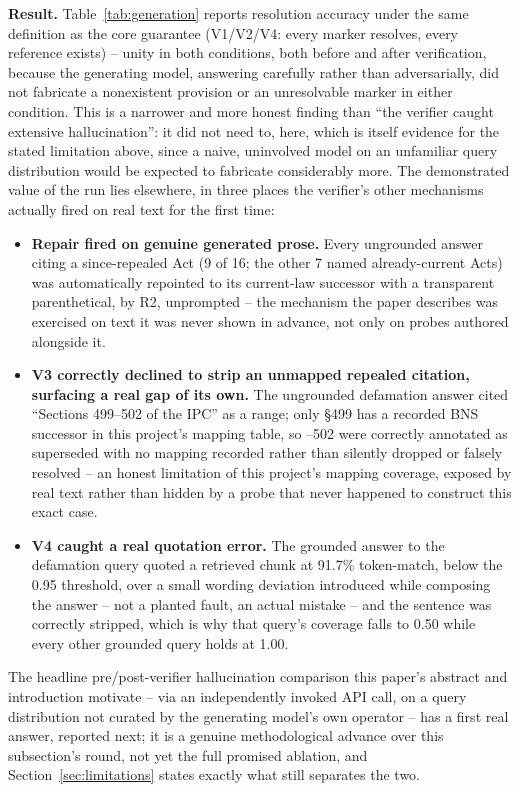 \documentclass[conference]{IEEEtran}
\begin{document}
\textbf{Result.} Table~\ref{tab:generation} reports resolution accuracy under
the same definition as the core guarantee (V1/V2/V4: every marker resolves,
every reference exists) -- unity in both conditions, both before and after
verification, because the generating model, answering carefully rather than
adversarially, did not fabricate a nonexistent provision or an unresolvable
marker in either condition. This is a narrower and more honest finding than
``the verifier caught extensive hallucination'': it did not need to, here,
which is itself evidence for the stated limitation above, since a naive,
uninvolved model on an unfamiliar query distribution would be expected to
fabricate considerably more. The demonstrated value of the run lies elsewhere,
in three places the verifier's other mechanisms actually fired on real text
for the first time:

\begin{itemize}
\item \textbf{Repair fired on genuine generated prose.} Every ungrounded
answer citing a since-repealed Act (9 of 16; the other 7 named already-current
Acts) was automatically repointed to its current-law successor with a
transparent parenthetical, by R2, unprompted -- the mechanism the paper
describes was exercised on text it was never shown in advance, not only on
probes authored alongside it.
\item \textbf{V3 correctly declined to strip an unmapped repealed citation,
surfacing a real gap of its own.} The ungrounded defamation answer cited
``Sections 499--502 of the IPC'' as a range; only \S499 has a recorded BNS
successor in this project's mapping table, so --502 were correctly
annotated as superseded with no mapping recorded rather than silently dropped
or falsely resolved -- an honest limitation of this project's mapping
coverage, exposed by real text rather than hidden by a probe that never
happened to construct this exact case.
\item \textbf{V4 caught a real quotation error.} The grounded answer to the
defamation query quoted a retrieved chunk at 91.7\% token-match, below the
0.95 threshold, over a small wording deviation introduced while composing the
answer -- not a planted fault, an actual mistake -- and the sentence was
correctly stripped, which is why that query's coverage falls to 0.50 while
every other grounded query holds at 1.00.
\end{itemize}

The headline pre/post-verifier hallucination comparison this paper's abstract
and introduction motivate -- via an independently invoked API call, on a
query distribution not curated by the generating model's own operator --
has a first real answer, reported next; it is a genuine methodological
advance over this subsection's round, not yet the full promised ablation,
and Section~\ref{sec:limitations} states exactly what still separates the two.
\end{document}
